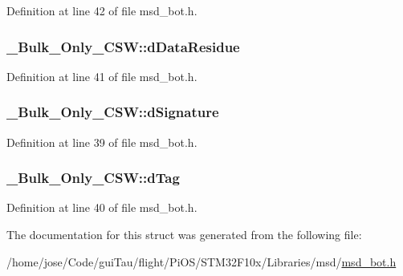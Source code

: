 Definition at line 42 of file msd\-\_\-bot.\-h.

\hypertarget{struct___bulk___only___c_s_w_a6ac97333841e8e4b90e2e4b6eaf86aa3}{
\subsubsection[{d\-Data\-Residue}]{ \-\_\-\-Bulk\-\_\-\-Only\-\_\-\-C\-S\-W\-::d\-Data\-Residue}}\label{struct___bulk___only___c_s_w_a6ac97333841e8e4b90e2e4b6eaf86aa3}


Definition at line 41 of file msd\-\_\-bot.\-h.

\hypertarget{struct___bulk___only___c_s_w_ae5a4c098a34cbfa8aab181f00d04f191}{
\subsubsection[{d\-Signature}]{ \-\_\-\-Bulk\-\_\-\-Only\-\_\-\-C\-S\-W\-::d\-Signature}}\label{struct___bulk___only___c_s_w_ae5a4c098a34cbfa8aab181f00d04f191}


Definition at line 39 of file msd\-\_\-bot.\-h.

\hypertarget{struct___bulk___only___c_s_w_ac33f4e90d62a86779945bf14ae015377}{
\subsubsection[{d\-Tag}]{ \-\_\-\-Bulk\-\_\-\-Only\-\_\-\-C\-S\-W\-::d\-Tag}}\label{struct___bulk___only___c_s_w_ac33f4e90d62a86779945bf14ae015377}


Definition at line 40 of file msd\-\_\-bot.\-h.



The documentation for this struct was generated from the following file\-:\begin{DoxyCompactItemize}
\item 
/home/jose/\-Code/gui\-Tau/flight/\-Pi\-O\-S/\-S\-T\-M32\-F10x/\-Libraries/msd/\hyperlink{msd__bot_8h}{msd\-\_\-bot.\-h}\end{DoxyCompactItemize}
